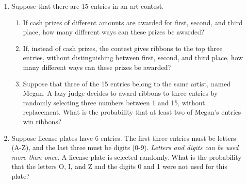 \begin{enumerate}
  \item Suppose that there are 15 entries in an art contest.
    \begin{enumerate}
      \item If cash prizes of different amounts are awarded for first, second, and third place, how many different ways can these prizes be awarded?
      \item If, instead of cash prizes, the contest gives ribbons to the top three entries, without distinguishing between first, second, and third place, how many different ways can these prizes be awarded? 
      \item Suppose that three of the 15 entries belong to the same artist, named Megan. A lazy judge decides to award ribbons to three entries by randomly selecting three numbers between 1 and 15, without replacement. What is the probability that at least two of Megan's entries win ribbons?
    \end{enumerate}

 \item
   Suppose license plates have 6 entries. The first three entries must be letters (A-Z), and the last three must be digits (0-9). \emph{Letters and digits can be used more than once.} A license plate is selected randomly. What is the probability that the letters O, I, and Z and the digits 0 and 1 were not used for this plate?\\
	


\end{enumerate}
